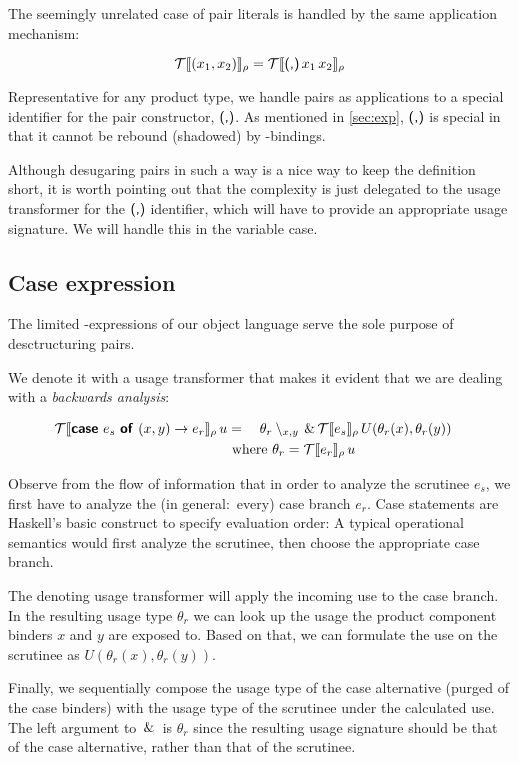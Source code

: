 The seemingly unrelated case of pair literals is handled by the same application mechanism:

\[
\mathcal{T}\llbracket(x_1,x_2)\rrbracket_{\rho} = \mathcal{T}\llbracket\text{\textsf{(,)}}\,x_1\,x_2\rrbracket_{\rho}
\]

Representative for any product type, we handle pairs as applications to a special identifier for the pair constructor, $\text{\textsf{(,)}}$.
As mentioned in \cref{sec:exp}, $\text{\textsf{(,)}}$ is special in that it cannot be rebound (\eg shadowed) by -bindings.

Although desugaring pairs in such a way is a nice way to keep the definition short, it is worth pointing out that the complexity is just delegated to the usage transformer for the $\text{\textsf{(,)}}$ identifier, which will have to provide an appropriate usage signature. 
We will handle this in the variable case.

\subsection{Case expression}

The limited -expressions of our object language serve the sole purpose of desctructuring pairs.

We denote it with a usage transformer that makes it evident that we are dealing with a \emph{backwards analysis}:

\begin{alignat*}{2}
\transfer{\sCase{e_s}{x}{y}{e_r}}{\rho}\,u &{}={}& \theta_r\setminus_{x,y} \both \transfer{e_s}{\rho}\,U(\theta_r(x),\theta_r(y)) \\
   &\rlap{ where $\theta_r = \transfer{e_r}{\rho}\,u$} &&
\end{alignat*}

Observe from the flow of information that in order to analyze the scrutinee $e_s$, we first have to analyze the (in general:\ every) case branch $e_r$. 
Case statements are Haskell's basic construct to specify evaluation order: 
A typical operational semantics would first analyze the scrutinee, then choose the appropriate case branch.

The denoting usage transformer will apply the incoming use to the case branch.
In the resulting usage type $\theta_r$ we can look up the usage the product component binders $x$ and $y$ are exposed to.
Based on that, we can formulate the use on the scrutinee as $U(\theta_r(x), \theta_r(y))$.

Finally, we sequentially compose the usage type of the case alternative (purged of the case binders) with the usage type of the scrutinee under the calculated use.
The left argument to $\,\&\,$ is $\theta_r$ since the resulting usage signature should be that of the case alternative, rather than that of the scrutinee.

